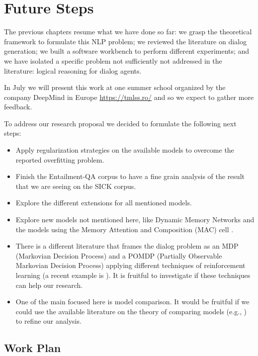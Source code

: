 \chapter{Future Steps}
\label{ch04:FutureSteps}

The previous chapters resume what we have done so far: we grasp the theoretical framework to formulate this NLP problem; we reviewed the literature on dialog generation; we built a software workbench to perform different experiments; and we have isolated a specific problem not sufficiently not addressed in the literature: logical reasoning for dialog agents.

In July we will present this work at one summer school organized by the company DeepMind in Europe \url{https://tmlss.ro/} and so we expect to gather more feedback.

To address our research proposal we decided to formulate the following next steps:

\begin{itemize}
\item Apply regularization strategies on the available models to overcome the reported overfitting problem. 
\item Finish the Entailment-QA corpus to have a fine grain analysis of the result that we are seeing on the SICK corpus.
\item Explore the different extensions for all mentioned models.
\item Explore new models not mentioned here, like Dynamic Memory Networks \cite{KumarISBEPOGS15} and the models using the Memory Attention and Composition (MAC) cell \cite{Manning18}.
\item There is a different literature that frames the dialog problem as an MDP (Markovian Decision Process) and a POMDP (Partially Observable Markovian Decision Process) applying different techniques of reinforcement learning (a recent example is \cite{Li:2016}). It is fruitful to investigate if these techniques can help our research.
\item One of the main focused here is model comparison. It would be fruitful if we could use the available literature  on the theory of comparing models (e.g.,  \cite{BenavoliCDZ17}) to refine our analysis.
\end{itemize}


\section{Work Plan}
\label{sec:work-plan}

